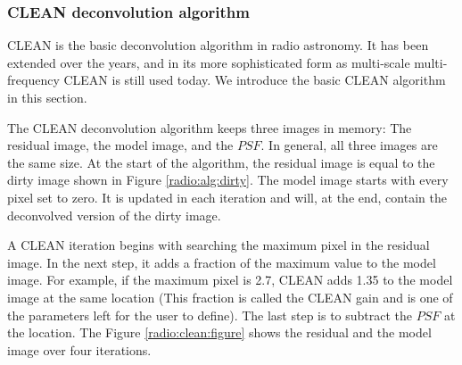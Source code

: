 \subsubsection{CLEAN deconvolution algorithm} \label{intro2:CLEAN}
CLEAN\cite{hogbom1974aperture} is the basic deconvolution algorithm in radio astronomy. It has been extended over the years, and in its more sophisticated form as multi-scale multi-frequency CLEAN \cite{offringa2017optimized} is still used today. We introduce the basic CLEAN algorithm in this section.

The CLEAN deconvolution algorithm keeps three images in memory: The residual image, the model image, and the $PSF$. In general, all three images are the same size. At the start of the algorithm, the residual image is equal to the dirty image shown in Figure \ref{radio:alg:dirty}. The model image starts with every pixel set to zero. It is updated in each iteration and will, at the end, contain the deconvolved version of the dirty image.

A CLEAN iteration begins with searching the maximum pixel in the residual image. In the next step, it adds a fraction of the maximum value to the model image. For example, if the maximum pixel is 2.7, CLEAN adds 1.35 to the model image at the same location (This fraction is called the CLEAN gain and is one of the parameters left for the user to define). The last step is to subtract the $PSF$ at the location. The Figure \ref{radio:clean:figure} shows the residual and the model image over four iterations.

